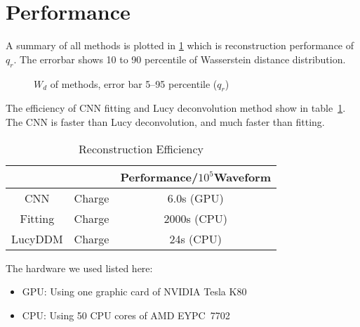 \section{Performance} %
A summary of all methods is plotted in \ref{fig:chargesummary} which is reconstruction performance of $q_{r}$. The errorbar shows 10 to 90 percentile of Wasserstein distance distribution. 

\begin{figure}[H]
    \centering
    \scalebox{0.35}{}
    \caption{\label{fig:chargesummary} $W_{d}$ of methods, error bar 5--95 percentile ($q_{r}$)}
\end{figure}

The efficiency of CNN fitting and Lucy deconvolution method show in table~\ref{fig:efficiency}. The CNN is faster than Lucy deconvolution, and much faster than fitting. 

\begin{table}[H]
    \centering
    \caption{\label{fig:efficiency} Reconstruction Efficiency}
    \begin{tabular}{c|c|c}
        \hline
        & & Performance/$10^{5}$Waveform \\
        \hline
        CNN & Charge & 6.0s (GPU) \\
        \hline
        Fitting & Charge & 2000s (CPU) \\
        \hline
        LucyDDM & Charge & 24s (CPU) \\
        \hline
    \end{tabular}
\end{table}
\hspace{4mm}

The hardware we used listed here: 
\begin{center}
\begin{itemize}
    \item GPU: Using one graphic card of NVIDIA\textsuperscript{\textregistered} Tesla\textsuperscript{\textregistered} K80
    \item CPU: Using 50 CPU cores of AMD EYPC\texttrademark\ 7702
\end{itemize}
\end{center}

